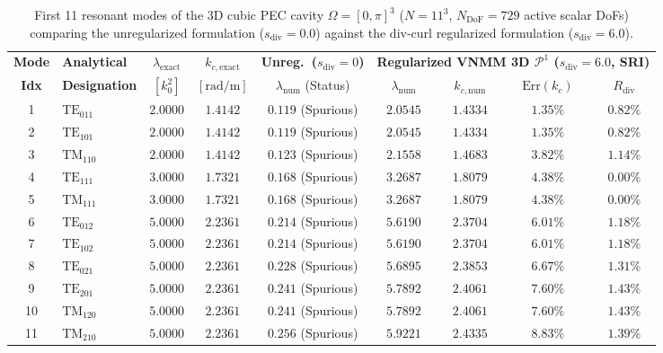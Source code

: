 \documentclass[preprint,12pt]{elsarticle}
\begin{document}
\begin{table}[htbp]
\centering
\caption{First 11 resonant modes of the 3D cubic PEC cavity $\Omega = [0,\pi]^3$ ($N=11^3$, $N_{\text{DoF}} = 729$ active scalar DoFs) comparing the unregularized formulation ($s_{\text{div}} = 0.0$) against the div-curl regularized formulation ($s_{\text{div}} = 6.0$).}
\label{tab:cavity_11modes_3d}
\footnotesize
\begin{tabular}{clccccccc}
\toprule
\textbf{Mode} & \textbf{Analytical} & $\lambda_{\text{exact}}$ & $k_{c,\text{exact}}$ & \textbf{Unreg.\ ($s_{\text{div}}=0$)} & \multicolumn{4}{c}{\textbf{Regularized VNMM 3D $\mathcal{P}^1$ ($s_{\text{div}} = 6.0$, SRI)}} \\
\cmidrule(lr){6-9}
\textbf{Idx} & \textbf{Designation} & $[k_0^2]$ & $[\text{rad/m}]$ & $\lambda_{\text{num}}$ (Status) & $\lambda_{\text{num}}$ & $k_{c,\text{num}}$ & $\text{Err}(k_c)$ & $R_{\text{div}}$ \\
\midrule
1  & $\text{TE}_{011}$ & $2.0000$ & $1.4142$ & $0.119$ (Spurious) & $2.0545$ & $1.4334$ & $1.35\%$ & $0.82\%$ \\
2  & $\text{TE}_{101}$ & $2.0000$ & $1.4142$ & $0.119$ (Spurious) & $2.0545$ & $1.4334$ & $1.35\%$ & $0.82\%$ \\
3  & $\text{TM}_{110}$ & $2.0000$ & $1.4142$ & $0.123$ (Spurious) & $2.1558$ & $1.4683$ & $3.82\%$ & $1.14\%$ \\
\midrule
4  & $\text{TE}_{111}$ & $3.0000$ & $1.7321$ & $0.168$ (Spurious) & $3.2687$ & $1.8079$ & $4.38\%$ & $0.00\%$ \\
5  & $\text{TM}_{111}$ & $3.0000$ & $1.7321$ & $0.168$ (Spurious) & $3.2687$ & $1.8079$ & $4.38\%$ & $0.00\%$ \\
\midrule
6  & $\text{TE}_{012}$ & $5.0000$ & $2.2361$ & $0.214$ (Spurious) & $5.6190$ & $2.3704$ & $6.01\%$ & $1.18\%$ \\
7  & $\text{TE}_{102}$ & $5.0000$ & $2.2361$ & $0.214$ (Spurious) & $5.6190$ & $2.3704$ & $6.01\%$ & $1.18\%$ \\
8  & $\text{TE}_{021}$ & $5.0000$ & $2.2361$ & $0.228$ (Spurious) & $5.6895$ & $2.3853$ & $6.67\%$ & $1.31\%$ \\
9  & $\text{TE}_{201}$ & $5.0000$ & $2.2361$ & $0.241$ (Spurious) & $5.7892$ & $2.4061$ & $7.60\%$ & $1.43\%$ \\
10 & $\text{TM}_{120}$ & $5.0000$ & $2.2361$ & $0.241$ (Spurious) & $5.7892$ & $2.4061$ & $7.60\%$ & $1.43\%$ \\
11 & $\text{TM}_{210}$ & $5.0000$ & $2.2361$ & $0.256$ (Spurious) & $5.9221$ & $2.4335$ & $8.83\%$ & $1.39\%$ \\
\bottomrule
\end{tabular}
\end{table}
\end{document}
